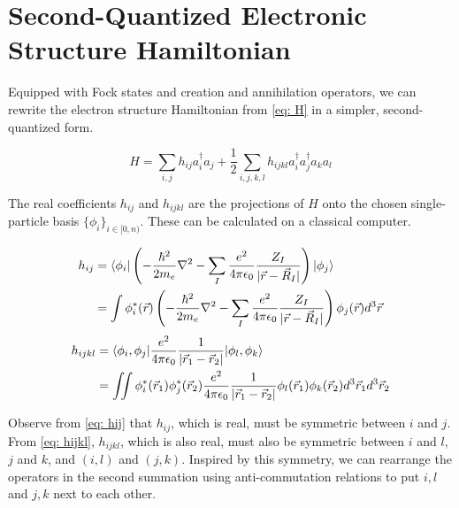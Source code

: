 \section{Second-Quantized Electronic Structure Hamiltonian}

Equipped with Fock states and creation and annihilation operators, we can rewrite the electron structure Hamiltonian from \eqref{eq: H} in a simpler, second-quantized form.

\begin{equation}
    H = \sum_{i, j} h_{ij}a^\dag_ia_j + \frac{1}{2}\sum_{i,j,k,l} h_{ijkl}a^\dag_ia^\dag_ja_ka_l
\end{equation}

The real coefficients $h_{ij}$ and $h_{ijkl}$ are the projections of $H$ onto the chosen single-particle basis $\{\phi_i\}_{i \in [0, n)}$. These can be calculated on a classical computer.

\begin{equation}
    \begin{split}
        h_{ij} &= \braket{\phi_i | \left(-\frac{\hbar^2}{2m_e}\nabla^2 - \sum_I \frac{e^2}{4\pi\epsilon_0}\frac{Z_I}{|\vec{r} - \vec{R}_I|}\right) | \phi_j} \\
        &= \int \phi^*_i(\vec{r})\left(-\frac{\hbar^2}{2m_e}\nabla^2 - \sum_I \frac{e^2}{4\pi\epsilon_0}\frac{Z_I}{|\vec{r} - \vec{R}_I|}\right)\phi_j(\vec{r}) d^3\vec{r}
    \end{split}
    \label{eq: hij}
\end{equation}
\begin{equation}
    \begin{split}
        h_{ijkl} &= \braket{\phi_i, \phi_j | \frac{e^2}{4\pi\epsilon_0}\frac{1}{|\vec{r}_1 - \vec{r}_2|} | \phi_l, \phi_k} \\
        &= \iint \phi^*_i(\vec{r}_1)\phi^*_j(\vec{r}_2)\frac{e^2}{4\pi\epsilon_0}\frac{1}{|\vec{r}_1 - \vec{r}_2|}\phi_l(\vec{r}_1)\phi_k(\vec{r}_2) d^3\vec{r}_1d^3\vec{r}_2
    \end{split}
    \label{eq: hijkl}
\end{equation}

Observe from \eqref{eq: hij} that $h_{ij}$, which is real, must be symmetric between $i$ and $j$. From \eqref{eq: hijkl}, $h_{ijkl}$, which is also real, must also be symmetric between $i$ and $l$, $j$ and $k$, and $(i, l)$ and $(j, k)$. Inspired by this symmetry, we can rearrange the operators in the second summation using anti-commutation relations to put $i, l$ and $j, k$ next to each other.

